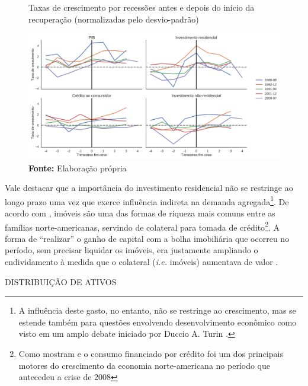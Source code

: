 \begin{figure}[htb]
	\centering
	\caption{Taxas de crescimento por recessões antes e depois do início da recuperação (normalizadas pelo desvio-padrão)}
	\label{FigRecuperacaoNorm}
	\includegraphics[width=\textwidth]{../../Dados/Fatos_Estilizados/figs/Centrado_Fim_Norm.png}
	\caption*{\textbf{Fonte:} Elaboração própria}
\end{figure}



Vale destacar que a importância do investimento residencial não se restringe ao longo prazo uma vez que exerce influência indireta na demanda agregada\footnote{
	A influência deste gasto, no entanto, não se restringe ao crescimento, mas se estende também para questões envolvendo desenvolvimento econômico como visto em um amplo debate iniciado por Duccio A. Turin \cite{pheng_revisit_1992}.}. 
De acordo com \textcite{teixeira_uma_2011}, imóveis são uma das formas de riqueza mais comuns entre as famílias norte-americanas, servindo de colateral para tomada de crédito\footnote{Como mostram \textcite{zezza_u.s._2008} e \textcite{barba_rising_2009} o consumo financiado por crédito foi um dos principais motores do crescimento da economia norte-americana no período que antecedeu a crise de 2008}. A forma de ``realizar'' o ganho de capital com a bolha imobiliária que ocorreu no período, sem precisar liquidar os imóveis, era justamente ampliando o endividamento à medida que o colateral (\textit{i.e.} imóveis) aumentava de valor \cite{teixeira_crescimento_2015}. 

DISTRIBUIÇÃO DE ATIVOS

